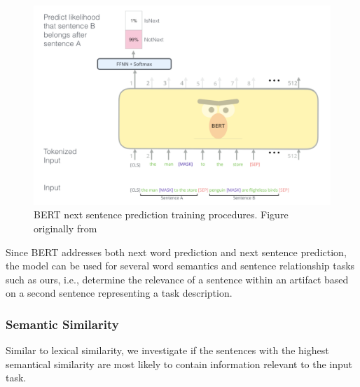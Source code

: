 \begin{figure}
    \centering
    \includegraphics[width=.75\linewidth]{fig/cp5/BERT}
    \caption{BERT next sentence prediction training procedures. Figure originally from~\cite{jay-alammar-bert}  }
    \label{fig:BERT}
\end{figure}



Since BERT addresses both next word prediction and next sentence prediction, the model can be used for several
word semantics and sentence relationship tasks such as  ours, i.e., determine the relevance of a sentence within an artifact based on a second sentence representing a task description. 





\subsubsection{Semantic Similarity}
\label{cp5:skip-gram}


Similar to lexical similarity,  we investigate if the sentences with the highest semantical similarity are most likely to contain information relevant to the input task.


